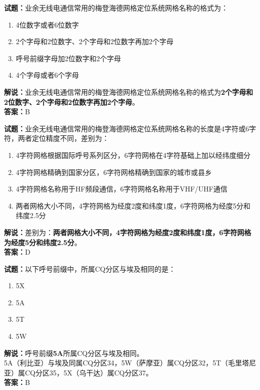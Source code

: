 \documentclass{ctexbook}
\begin{document}
\bigskip


\noindent\textbf{试题：}业余无线电通信常用的梅登海德网格定位系统网格名称的格式为：
\begin{enumerate}[leftmargin=3em]
\item 4位数字或者6位数字
\item 2个字母和2位数字、2个字母和2位数字再加2个字母
\item 呼号前缀字母加2位数字和2个字母
\item 4个字母或者6个字母
\end{enumerate}
\noindent\textbf{解说：}业余无线电通信常用的梅登海德网格定位系统网格名称的格式为\textbf{2个字母和2位数字、2个字母和2位数字再加2个字母}。\\\noindent\textbf{答案：}B




\bigskip


\noindent\textbf{试题：}业余无线电通信常用的梅登海德网格定位系统网格名称的长度是4字符或6字符，两者定位精度不同，差别为：
\begin{enumerate}[leftmargin=3em]
\item 4字符网格根据国际呼号系列区分，6字符网格在4字符基础上加以经纬度细分
\item 4字符网格精确到国家分区，6字符网格精确到国家的城市或县乡
\item 4字符网格名称用于HF频段通信，6字符网格名称用于VHF/UHF通信
\item 两者网格大小不同，4字符网格为经度2度和纬度1度，6字符网格为经度5分和纬度2.5分
\end{enumerate}
\noindent\textbf{解说：}差别为：\textbf{两者网格大小不同，4字符网格为经度2度和纬度1度，6字符网格为经度5分和纬度2.5分}。\\\noindent\textbf{答案：}D


\bigskip

\noindent\textbf{试题：}以下呼号前缀中，所属CQ分区与埃及相同的是：
\begin{enumerate}[leftmargin=3em]
	\item 5X
	\item 5A
	\item 5T
	\item 5W
\end{enumerate}
\noindent\textbf{解说：}呼号前缀\textbf{5A}所属CQ分区与埃及相同。\\5A（利比亚）与埃及同属CQ分区34，5W（萨摩亚）属CQ分区32，5T（毛里塔尼亚）属CQ分区35，5X（乌干达）属CQ分区37。\\\noindent\textbf{答案：}B

\bigskip
\end{document}
